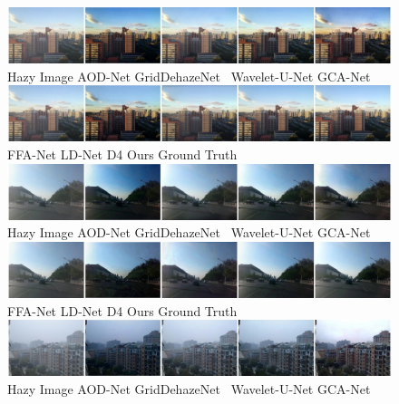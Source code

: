 \documentclass[lettersize,journal]{IEEEtran}
\begin{document}
\begin{figure}[ph!t]
    \centering
    \includegraphics[width=16.5cm]{0_1.jpg} \\
    Hazy Image\qquad\quad\;\; AOD-Net\cite{li2017aod} \qquad GridDehazeNet\cite{liu2019griddehazenet} \;\, Wavelet-U-Net\cite{yang2019wavelet} \qquad GCA-Net\cite{chen2019gated}\\
    
    \includegraphics[width=16.5cm]{0_2.jpg} \\ 
    FFA-Net\cite{qin2020ffa} \qquad\quad\; LD-Net\cite{ullah2021light} \qquad\qquad\; D4\cite{yang2022d4} \qquad\qquad\qquad\; Ours \qquad\qquad\quad Ground Truth \\
    
    \includegraphics[width=16.5cm]{1_1.jpg} \\ 
    Hazy Image\qquad\quad\;\; AOD-Net\cite{li2017aod} \qquad GridDehazeNet\cite{liu2019griddehazenet} \;\, Wavelet-U-Net\cite{yang2019wavelet} \qquad GCA-Net\cite{chen2019gated}\\
    
    \includegraphics[width=16.5cm]{1_2.jpg} \\ 
    FFA-Net\cite{qin2020ffa} \qquad\quad\; LD-Net\cite{ullah2021light} \qquad\qquad\; D4\cite{yang2022d4} \qquad\qquad\qquad\; Ours \qquad\qquad\quad Ground Truth \\
    
    \includegraphics[width=16.5cm]{2_1.jpg} \\
    Hazy Image\qquad\quad\;\; AOD-Net\cite{li2017aod} \qquad GridDehazeNet\cite{liu2019griddehazenet} \;\, Wavelet-U-Net\cite{yang2019wavelet} \qquad GCA-Net\cite{chen2019gated}\\
    

\end{figure}
\end{document}
